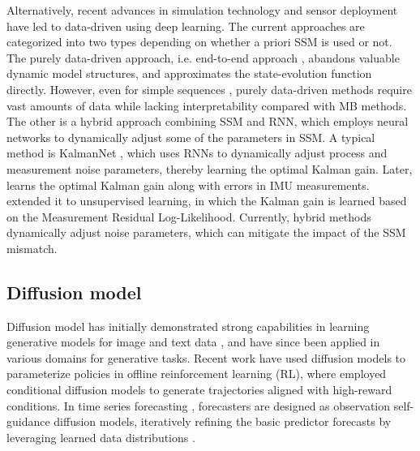 Alternatively, recent advances in simulation technology and sensor deployment \cite{10508326} have led to data-driven using deep learning. 
The current approaches are categorized into two types depending on whether a priori SSM is used or not.
The purely data-driven approach, i.e. end-to-end approach \cite{10320373, YAN2024102580}, abandons valuable dynamic model structures, and approximates the state-evolution function directly. 
However, even for simple sequences \cite{zaheer2017latent}, purely data-driven methods require vast amounts of data while lacking interpretability compared with MB methods.
The other is a hybrid approach combining SSM and RNN, which employs neural networks to dynamically adjust some of the parameters in SSM. 
A typical method is KalmanNet \cite {9733186}, which uses RNNs to dynamically adjust process and measurement noise parameters, thereby learning the optimal Kalman gain. 
Later, \cite{ 10288023} learns the optimal Kalman gain along with errors in IMU measurements. \cite{10566495} extended it to unsupervised learning, in which the Kalman gain is learned based on the Measurement Residual Log-Likelihood. 
Currently, hybrid methods dynamically adjust noise parameters, which can mitigate the impact of the SSM mismatch.

\subsection{Diffusion model}

Diffusion model has initially demonstrated strong capabilities in learning generative models for image and text data \cite{ho2022video, xu2023versatile}, and have since been applied in various domains for generative tasks. 
Recent work have used diffusion models to parameterize policies in offline reinforcement learning (RL), where \cite{ajay2023is, 10.5555/3618408.3619493} employed conditional diffusion models to generate trajectories aligned with high-reward conditions. 
In time series forecasting \cite{10.5555/3666122.3667354, fan2024mgtsd}, forecasters are designed as observation self-guidance diffusion models, iteratively refining the basic predictor forecasts by leveraging learned data distributions \cite{10.5555/3666122.3667354}.



